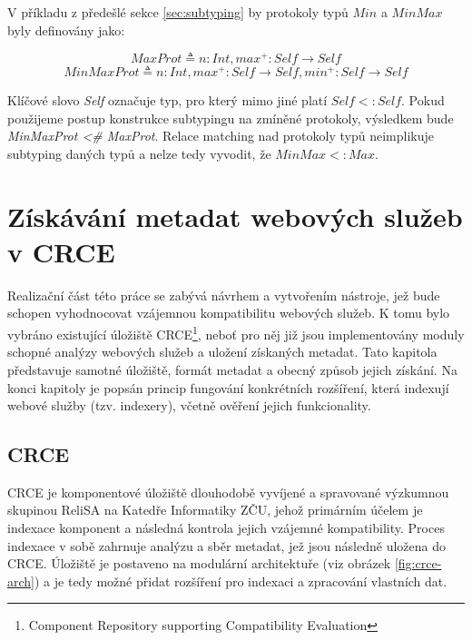 \documentclass[czech,DP]{thesiskiv}
\begin{document}
V příkladu z předešlé sekce \ref{sec:subtyping} by protokoly typů $Min$ a $MinMax$ byly definovány jako:

\begin{equation}
	MaxProt \triangleq n:Int, max^+: Self \rightarrow Self
\end{equation}
\begin{equation}
	MinMaxProt \triangleq n:Int, max^+: Self \rightarrow Self, min^+: Self \rightarrow Self
\end{equation}

Klíčové slovo \textit{Self} označuje typ, pro který mimo jiné platí $Self <: Self$. Pokud použijeme postup konstrukce subtypingu na zmíněné protokoly, výsledkem bude \textit{MinMaxProt <\# MaxProt}. Relace matching nad protokoly typů neimplikuje subtyping daných typů a nelze tedy vyvodit, že $MinMax <: Max$.


\chapter{Získávání metadat webových služeb v CRCE}
\label{sec:crce}

Realizační část této práce se zabývá návrhem a vytvořením nástroje, jež bude schopen vyhodnocovat vzájemnou kompatibilitu webových služeb. K tomu bylo vybráno existující úložiště CRCE\footnote{Component Repository supporting Compatibility Evaluation}, neboť pro něj již jsou implementovány moduly schopné analýzy webových služeb a uložení získaných metadat. Tato kapitola představuje samotné úložiště, formát metadat a obecný způsob jejich získání. Na konci kapitoly je popsán princip fungování konkrétních rozšíření, která indexují webové služby (tzv. indexery), včetně ověření jejich funkcionality.

\section{CRCE}

CRCE je komponentové úložiště dlouhodobě vyvíjené a spravované výzkumnou skupinou ReliSA na Katedře Informatiky ZČU, jehož primárním účelem je indexace komponent a následná kontrola jejich vzájemné kompatibility. Proces indexace v sobě zahrnuje analýzu a sběr metadat, jež jsou následně uložena do CRCE. Úložiště je postaveno na modulární architektuře (viz obrázek \ref{fig:crce-arch}) a je tedy možné přidat rozšíření pro indexaci a zpracování vlastních dat.
\end{document}
